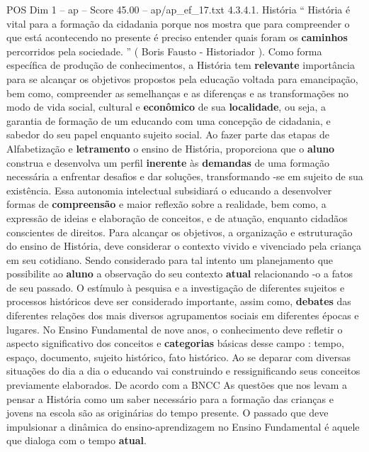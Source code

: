 \begin{textsample}{POS Dim 1 – ap – Score 45.00 – ap/ap\_ef\_17.txt}  \label{ex:f1_pos_168}
4.3.4.1.
História “ História é vital para a formação da cidadania porque nos mostra que para compreender o que está acontecendo no presente é preciso entender quais foram os \textbf{caminhos} percorridos pela sociedade. ” ( Boris Fausto - Historiador ).
Como forma específica de produção de conhecimentos, a História tem \textbf{relevante} importância para se alcançar os objetivos propostos pela educação voltada para emancipação, bem como, compreender as semelhanças e as diferenças e as transformações no modo de vida social, cultural e \textbf{econômico} de sua \textbf{localidade}, ou seja, a garantia de formação de um educando com uma concepção de cidadania, e sabedor do seu papel enquanto sujeito social.
Ao fazer parte das etapas de Alfabetização e \textbf{letramento} o ensino de História, proporciona que o \textbf{aluno} construa e desenvolva um perfil \textbf{inerente} às \textbf{demandas} de uma formação necessária a enfrentar desafios e dar soluções, transformando -se em sujeito de sua existência.
Essa autonomia intelectual subsidiará o educando a desenvolver formas de \textbf{compreensão} e maior reflexão sobre a realidade, bem como, a expressão de ideias e elaboração de conceitos, e de atuação, enquanto cidadãos conscientes de direitos.
Para alcançar os objetivos, a organização e estruturação do ensino de História, deve considerar o contexto vivido e vivenciado pela criança em seu cotidiano.
Sendo considerado para tal intento um planejamento que possibilite ao \textbf{aluno} a observação do seu contexto \textbf{atual} relacionando -o a fatos de seu passado.
O estímulo à pesquisa e a investigação de diferentes sujeitos e processos históricos deve ser considerado importante, assim como, \textbf{debates} das diferentes relações dos mais diversos agrupamentos sociais em diferentes épocas e lugares.
No Ensino Fundamental de nove anos, o conhecimento deve refletir o aspecto significativo dos conceitos e \textbf{categorias} básicas desse campo : tempo, espaço, documento, sujeito histórico, fato histórico.
Ao se deparar com diversas situações do dia a dia o educando vai construindo e ressignificando seus conceitos previamente elaborados.
De acordo com a BNCC As questões que nos levam a pensar a História como um saber necessário para a formação das crianças e jovens na escola são as originárias do tempo presente.
O passado que deve impulsionar a dinâmica do ensino-aprendizagem no Ensino Fundamental é aquele que dialoga com o tempo \textbf{atual}.

\end{textsample}
